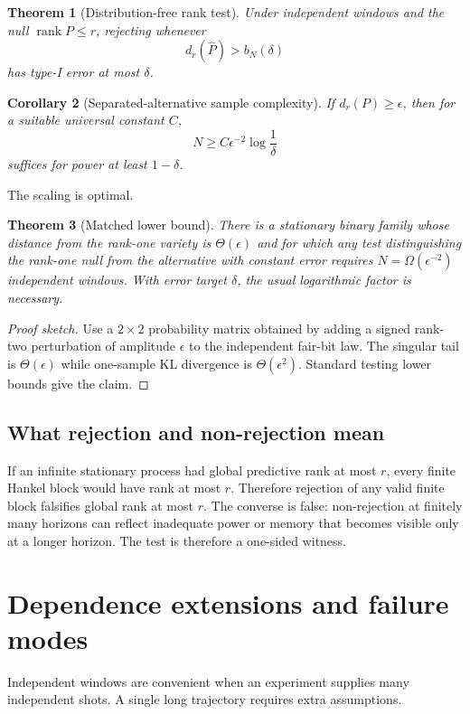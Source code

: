 \documentclass[11pt]{article}
\newtheorem{theorem}{Theorem}[section]
\newtheorem{corollary}[theorem]{Corollary}
\newcommand{\rank}{\operatorname{rank}}
\begin{document}
\begin{theorem}[Distribution-free rank test]
Under independent windows and the null $\rank P\le r$, rejecting whenever
\begin{equation}
d_r(\widehat P)>b_N(\delta)
\end{equation}
has type-I error at most $\delta$.
\end{theorem}

\begin{corollary}[Separated-alternative sample complexity]
If $d_r(P)\ge\epsilon$, then for a suitable universal constant $C$,
\begin{equation}
N\ge C\epsilon^{-2}\log\frac1\delta
\end{equation}
suffices for power at least $1-\delta$.
\end{corollary}

The scaling is optimal.

\begin{theorem}[Matched lower bound]
There is a stationary binary family whose distance from the rank-one variety is $\Theta(\epsilon)$ and for which any test distinguishing the rank-one null from the alternative with constant error requires $N=\Omega(\epsilon^{-2})$ independent windows. With error target $\delta$, the usual logarithmic factor is necessary.
\end{theorem}
\begin{proof}[Proof sketch]
Use a $2\times2$ probability matrix obtained by adding a signed rank-two perturbation of amplitude $\epsilon$ to the independent fair-bit law. The singular tail is $\Theta(\epsilon)$ while one-sample KL divergence is $\Theta(\epsilon^2)$. Standard testing lower bounds give the claim.
\end{proof}

\subsection{What rejection and non-rejection mean}
If an infinite stationary process had global predictive rank at most $r$, every finite Hankel block would have rank at most $r$. Therefore rejection of any valid finite block falsifies global rank at most $r$. The converse is false: non-rejection at finitely many horizons can reflect inadequate power or memory that becomes visible only at a longer horizon. The test is therefore a one-sided witness.

\section{Dependence extensions and failure modes}
Independent windows are convenient when an experiment supplies many independent shots. A single long trajectory requires extra assumptions.
\end{document}
